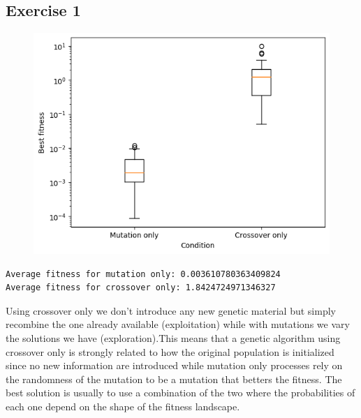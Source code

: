 \subsection{Exercise 1}
\begin{figure}[H]
    \centering
    \includegraphics[width=\linewidth]{images/lab2/no_cross_no_mut.png}
\end{figure}
\begin{lstlisting}
Average fitness for mutation only: 0.003610780363409824
Average fitness for crossover only: 1.8424724971346327
\end{lstlisting}
Using crossover only we don't introduce any new genetic material but simply recombine the one already available (exploitation) while with mutations we vary the solutions we have (exploration).This means that a genetic algorithm using crossover only is strongly related to how the original population is initialized since no new information are introduced while mutation only processes rely on the randomness of the mutation to be a mutation that betters the fitness. The best solution is usually to use a combination of the two where the probabilities of each one depend on the shape of the fitness landscape.

